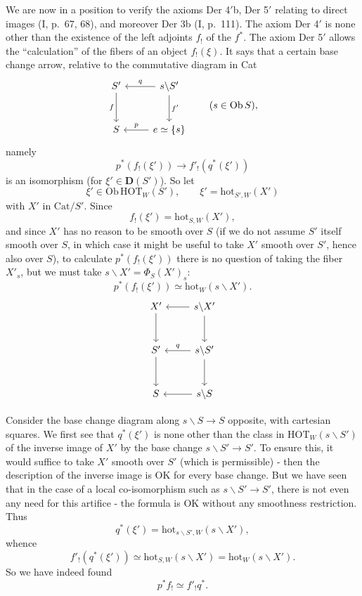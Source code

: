 \documentclass[11pt]{article}
\newcommand{\printedpage}[1]{\marginpar{\footnotesize p.~#1}}
\newcommand{\msp}[1]{\marginpar{\footnotesize [#1]}}
\newcommand{\hot}{\mathrm{hot}}
\newcommand{\HOT}{\mathrm{HOT}}
\newcommand{\Cat}{\mathrm{Cat}}
\begin{document}
We are now in a position to verify the axioms Der 4$'$b, Der 5$'$ relating to direct images (I, p.~67, 68), and moreover Der 3b (I, p.~111). The axiom Der 4$'$ is none other than the existence of the left adjoints $f_!$ of the $f^*$. The axiom Der 5$'$ allows the ``calculation'' of the fibers of an object $f_!(\xi)$. It says that a certain
\printedpage{96}
\msp{157}
base change arrow, relative to the commutative diagram in Cat
\[\begin{tikzcd}[row sep=large]
S' \arrow[d,"f"'] & s\backslash S' \arrow[l,"q"'] \arrow[d,"f'"] \\
S & e\simeq\{s\} \arrow[l,"p"']
\end{tikzcd}\qquad(s\in\mathrm{Ob}\,S),\]
namely
\[p^*(f_!(\xi'))\longrightarrow f'_!(q^*(\xi'))\]
is an isomorphism (for $\xi'\in\mathbf{D}(S')$). So let
\[\xi'\in\mathrm{Ob}\,\HOT_W(S'),\qquad\xi'=\hot_{S',W}(X')\]
with $X'$ in $\Cat/S'$. Since
\[f_!(\xi')=\hot_{S,W}(X'),\]
and since $X'$ has no reason to be smooth over $S$ (if we do not assume $S'$ itself smooth over $S$, in which case it might be useful to take $X'$ smooth over $S'$, hence also over $S$), to calculate $p^*(f_!(\xi'))$ there is no question of taking the fiber $X'_s$, but we must take $s\backslash X'=\Phi_S(X')_s$:
\[p^*(f_!(\xi'))\simeq\hot_W(s\backslash X').\]
\[\begin{tikzcd}[row sep=large]
X' \arrow[d] & s\backslash X' \arrow[l] \arrow[d] \\
S' \arrow[d] & s\backslash S' \arrow[l,"q"'] \arrow[d] \\
S & s\backslash S \arrow[l]
\end{tikzcd}\]

Consider the base change diagram along $s\backslash S\longrightarrow S$ opposite, with cartesian squares. We first see that $q^*(\xi')$ is none other than the class in $\HOT_W(s\backslash S')$ of the inverse image of $X'$ by the base change $s\backslash S'\longrightarrow S'$. To ensure this, it would suffice to take $X'$ smooth over $S'$ (which
\msp{158}
is permissible) - then the description of the inverse image is OK for every base change. But we have seen that in the case of a local co-isomorphism such as $s\backslash S'\longrightarrow S'$, there is not even any need for this artifice - the formula is OK without any smoothness restriction. Thus
\[q^*(\xi')=\hot_{s\backslash S',W}(s\backslash X'),\]
\printedpage{97}
whence
\[f'_!(q^*(\xi'))\simeq\hot_{S,W}(s\backslash X')=\hot_W(s\backslash X').\]
So we have indeed found
\[p^*f_!\simeq f'_!q^*.\]
\end{document}
